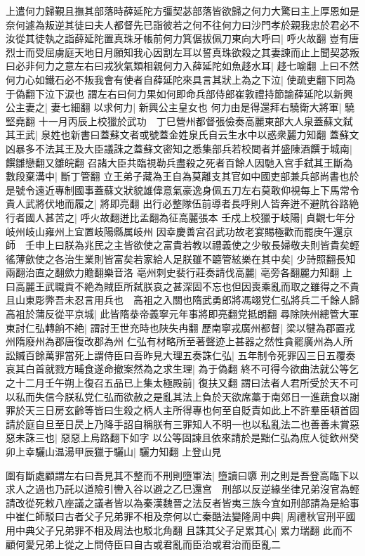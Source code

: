 上遣何力歸覲且撫其部落時薛延陀方彊契苾部落皆欲歸之何力大驚曰主上厚恩如是奈何遽為叛逆其徒曰夫人都督先已詣彼若之何不往何力曰沙門孝於親我忠於君必不汝從其徒執之詣薛延陀置真珠牙帳前何力箕倨拔佩刀東向大呼曰|{
	呼火故翻}
豈有唐烈士而受屈虜庭天地日月願知我心因割左耳以誓真珠欲殺之其妻諫而止上聞契苾叛曰必非何力之意左右曰戎狄氣類相親何力入薛延陀如魚趍水耳|{
	趍七喻翻}
上曰不然何力心如鐵石必不叛我會有使者自薛延陀來具言其狀上為之下泣|{
	使疏吏翻下同為于偽翻下泣下涙也}
謂左右曰何力果如何即命兵部侍郎崔敦禮持節諭薛延陀以新興公主妻之|{
	妻七細翻}
以求何力|{
	新興公主皇女也}
何力由是得還拜右驍衛大將軍|{
	驍堅堯翻}
十一月丙辰上校獵於武功　丁巳營州都督張儉奏高麗東部大人泉蓋蘇文弑其王武|{
	泉姓也新書曰蓋蘇文者或號蓋金姓泉氏自云生水中以惑衆麗力知翻}
蓋蘇文凶暴多不法其王及大臣議誅之蓋蘇文密知之悉集部兵若校閲者并盛陳酒饌于城南|{
	饌雛戀翻又雛皖翻}
召諸大臣共臨視勒兵盡殺之死者百餘人因馳入宫手弑其王斷為數段棄溝中|{
	斷丁管翻}
立王弟子藏為王自為莫離支其官如中國吏部兼兵部尚書也於是號令遠近專制國事蓋蘇文狀貌雄偉意氣豪逸身佩五刀左右莫敢仰視每上下馬常令貴人武將伏地而履之|{
	將即亮翻}
出行必整隊伍前導者長呼則人皆奔迸不避阬谷路絶行者國人甚苦之|{
	呼火故翻迸比孟翻為征高麗張本}
壬戍上校獵于岐陽|{
	貞觀七年分岐州岐山雍州上宜置岐陽縣属岐州}
因幸慶善宫召武功故老宴賜極歡而罷庚午還京師　壬申上曰朕為兆民之主皆欲使之富貴若教以禮義使之少敬長婦敬夫則皆貴矣輕徭薄歛使之各治生業則皆富矣若家給人足朕雖不聼管絃樂在其中矣|{
	少詩照翻長知兩翻治直之翻歛力贍翻樂音洛}
亳州刺史裴行莊奏請伐高麗|{
	亳旁各翻麗力知翻}
上曰高麗王武職貢不絶為賊臣所弑朕哀之甚深固不忘也但因喪乘亂而取之雖得之不貴且山東彫弊吾未忍言用兵也　高袓之入關也隋武勇郎將馮翊党仁弘將兵二千餘人歸高袓於蒲反從平京城|{
	此皆隋㳟帝義寧元年事將即亮翻党抵朗翻}
尋除陜州總管大軍東討仁弘轉餉不絶|{
	謂討王世充時也陜失冉翻}
歷南寧戎廣州都督|{
	梁以犍為郡置戎州隋廢州為郡唐復改郡為州}
仁弘有材略所至著聲迹上甚器之然性貪罷廣州為人所訟贓百餘萬罪當死上謂侍臣曰吾昨見大理五奏誅仁弘|{
	五年制令死罪囚三日五覆奏}
哀其白首就戮方晡食遂命撤案然為之求生理|{
	為于偽翻}
終不可得今欲曲法就公等乞之十二月壬午朔上復召五品已上集太極殿前|{
	復扶又翻}
謂曰法者人君所受於天不可以私而失信今朕私党仁弘而欲赦之是亂其法上負於天欲席藁于南郊日一進蔬食以謝罪於天三日房玄齡等皆曰生殺之柄人主所得專也何至自貶責如此上不許羣臣頓首固請於庭自旦至日昃上乃降手詔自稱朕有三罪知人不明一也以私亂法二也善善未賞惡惡未誅三也|{
	惡惡上烏路翻下如字}
以公等固諫且依來請於是黜仁弘為庶人徙欽州癸卯上幸驪山温湯甲辰獵于驪山|{
	驪力知翻}
上登山見

圍有斷處顧謂左右曰吾見其不整而不刑則墮軍法|{
	墮讀曰隳}
刑之則是吾登高臨下以求人之過也乃託以道險引轡入谷以避之乙巳還宫　刑部以反逆緣坐律兄弟沒官為輕請改從死敕八座議之議者皆以為秦漢魏晉之法反者皆夷三族今宜如刑部請為是給事中崔仁師駁曰古者父子兄弟罪不相及奈何以亡秦酷法變隆周中典|{
	周禮秋官刑平國用中典父子兄弟罪不相及周法也駁北角翻}
且誅其父子足累其心|{
	累力瑞翻}
此而不顧何愛兄弟上從之上問侍臣曰自古或君亂而臣治或君治而臣亂二

